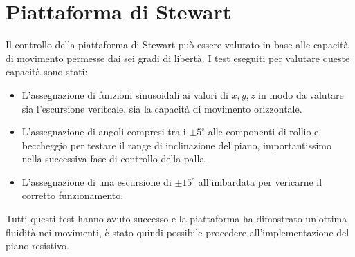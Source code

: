 \documentclass[12pt,twoside,openright]{report}
\begin{document}
\section{Piattaforma di Stewart}\label{resultstewart}
Il controllo della piattaforma di Stewart può essere valutato in base alle capacità di movimento permesse dai sei gradi di libertà. I test eseguiti per valutare queste capacità sono stati:
\begin{itemize}
\item L'assegnazione di funzioni sinusoidali ai valori di $x,y,z$ in modo da valutare sia l'escursione veritcale, sia la capacità di movimento orizzontale.
\item L'assegnazione di angoli compresi tra i $\pm 5^\circ$ alle componenti di rollio e beccheggio per testare il range di inclinazione del piano, importantissimo nella successiva fase di controllo della palla.
\item L'assegnazione di una escursione di $\pm 15^\circ$ all'imbardata per vericarne il corretto funzionamento.
\end{itemize}
Tutti questi test hanno avuto successo e la piattaforma ha dimostrato un'ottima fluidità nei movimenti, è stato quindi possibile procedere all'implementazione del piano resistivo.
\end{document}
